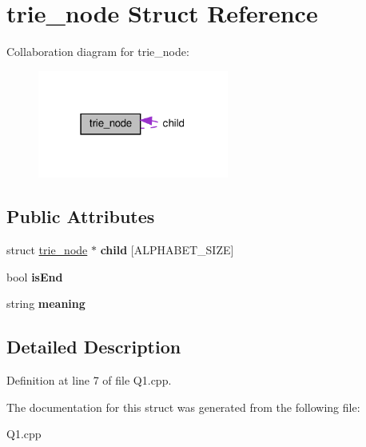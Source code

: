 \hypertarget{structtrie__node}{}\section{trie\+\_\+node Struct Reference}
\label{structtrie__node}


Collaboration diagram for trie\+\_\+node\+:
\nopagebreak
\begin{figure}[H]
\begin{center}
\leavevmode
\includegraphics[width=178pt]{structtrie__node__coll__graph}
\end{center}
\end{figure}
\subsection*{Public Attributes}
\begin{DoxyCompactItemize}
\item 
\mbox{\label{structtrie__node_ac9eb76e033bed9237efa23ad95c27645}} 
struct \hyperlink{structtrie__node}{trie\+\_\+node} $\ast$ {\bfseries child} \mbox{[}A\+L\+P\+H\+A\+B\+E\+T\+\_\+\+S\+I\+ZE\mbox{]}
\item 
\mbox{\label{structtrie__node_a74d43b68fc7ac64b7f113f7989662a02}} 
bool {\bfseries is\+End}
\item 
\mbox{\label{structtrie__node_a3a093711f6a6cea926a15dd47747dd24}} 
string {\bfseries meaning}
\end{DoxyCompactItemize}


\subsection{Detailed Description}


Definition at line 7 of file Q1.\+cpp.



The documentation for this struct was generated from the following file\+:\begin{DoxyCompactItemize}
\item 
Q1.\+cpp\end{DoxyCompactItemize}
